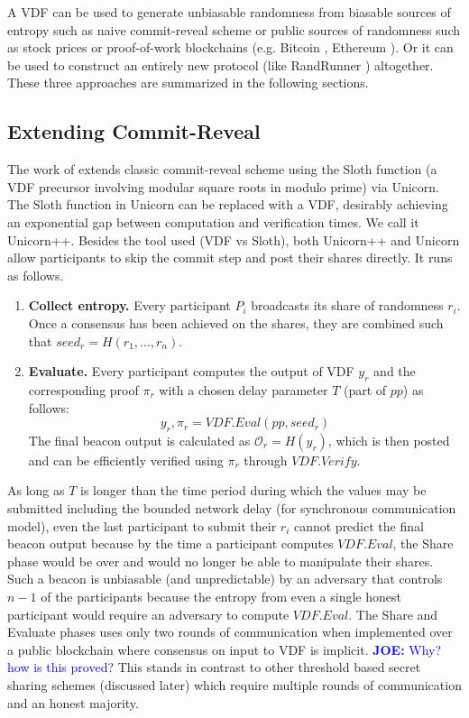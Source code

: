 \documentclass[letterpaper,twocolumn,10pt]{article}
\theoremstyle{definition}
\theoremstyle{remark}
\newcommand{\joenote}[1]{\textcolor{blue}{\textbf{JOE:} #1}}
\begin{document}
A VDF can be used to generate unbiasable randomness from biasable sources of entropy such as naive commit-reveal scheme or public sources of randomness such as stock prices or proof-of-work blockchains (e.g. Bitcoin \cite{nakamoto2019bitcoin}, Ethereum \cite{wood2014ethereum}). Or it can be used to construct an entirely new protocol (like RandRunner \cite{schindler2021randrunner}) altogether. These three approaches are summarized in the following sections.

\subsection{Extending Commit-Reveal}
\label{subsection:extending-commit-reveal}
The work of \cite{lenstra2015random} extends classic commit-reveal scheme using the Sloth function (a VDF precursor involving modular square roots in modulo prime) via Unicorn. The Sloth function in Unicorn can be replaced with a VDF, desirably achieving an exponential gap between computation and verification times. We call it Unicorn++. Besides the tool used (VDF vs Sloth), both Unicorn++ and Unicorn allow participants to skip the commit step and post their shares directly. It runs as follows.
\begin{enumerate}
    \item \textbf{Collect entropy.} Every participant $P_i$ broadcasts its share of randomness $r_i$. Once a consensus has been achieved on the shares, they are combined such that  $seed_r = H(r_1,\ldots, r_n)$.
    \item \textbf{Evaluate.} Every participant computes the output of VDF $y_r$ and the corresponding proof $\pi_r$ with a chosen delay parameter $T$ (part of $pp$) as follows:
    $$y_r, \pi_r = VDF.Eval(pp, seed_r)$$
    The final beacon output is calculated as $\mathcal{O}_r = H(y_r) $, which is then posted and can be efficiently verified using $\pi_r$ through $VDF.Verify$.
\end{enumerate}
As long as $T$ is longer than the time period during which the values may be submitted including the bounded network delay (for synchronous communication model), even the last participant to submit their $r_i$ cannot predict the final beacon output because by the time a participant computes $VDF.Eval$, the Share phase would be over and would no longer be able to manipulate their shares. Such a beacon is unbiasable (and unpredictable) by an adversary that controls $n-1$ of the participants because the entropy from even a single honest participant would require an adversary to compute  $VDF.Eval$. The Share and Evaluate phases uses only two rounds of communication when implemented over a public blockchain where consensus on input to VDF is implicit. \joenote{Why? how is this proved?} This stands in contrast to other threshold based secret sharing schemes (discussed later) which require multiple rounds of communication and an honest majority.
\end{document}

